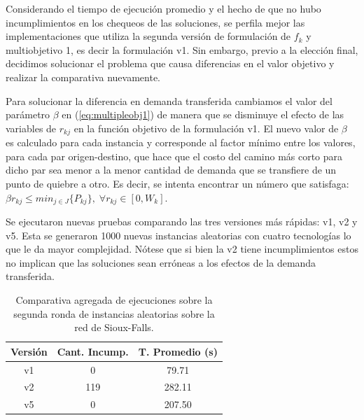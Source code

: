 \documentclass{article}
\begin{document}
  Considerando el tiempo de ejecución promedio y el hecho de que no hubo incumplimientos en los chequeos de las soluciones, se perfila mejor las implementaciones que utiliza la segunda versión de formulación de $f_k$ y multiobjetivo 1, es decir la formulación v1. Sin embargo, previo a la elección final, decidimos solucionar el problema que causa diferencias en el valor objetivo y realizar la comparativa nuevamente.

  Para solucionar la diferencia en demanda transferida cambiamos el valor del parámetro $\beta$ en (\ref{eq:multipleobj1}) de manera que se disminuye el efecto de las variables de $r_{kj}$ en la función objetivo de la formulación v1. El nuevo valor de $\beta$ es calculado para cada instancia y corresponde al factor mínimo entre los valores, para cada par origen-destino, que hace que el costo del camino más corto para dicho par sea menor a la menor cantidad de demanda que se transfiere de un punto de quiebre a otro. Es decir, se intenta encontrar un número que satisfaga: $\beta r_{kj} \leq min_{j \in J} \{ P_{kj} \},\; \forall r_{kj} \in [0, W_k]$.

  Se ejecutaron nuevas pruebas comparando las tres versiones más rápidas: v1, v2 y v5. Esta se generaron 1000 nuevas instancias aleatorias con cuatro tecnologías lo que le da mayor complejidad. Nótese que si bien la v2 tiene incumplimientos estos no implican que las soluciones sean erróneas a los efectos de la demanda transferida.


  \begin{table}[h!]
    \centering
    \begin{tabular}{ccc}
      \toprule
      Versión & Cant. Incump. & T. Promedio (s) \\
      \midrule
      v1 & 0   & 79.71   \\
      v2 & 119 & 282.11  \\
      v5 & 0   & 207.50  \\
      \bottomrule
    \end{tabular}
    \caption{Comparativa agregada de ejecuciones sobre la segunda ronda de instancias aleatorias sobre la red de Sioux-Falls.}\label{table:resumenreejecuciones}
  \end{table}
\end{document}

